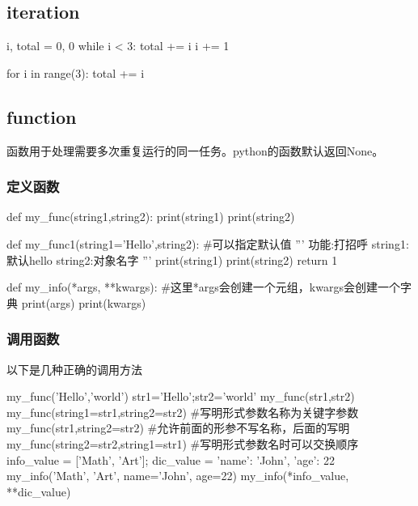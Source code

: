 \documentclass{article}
\begin{document}
    \subsection{iteration}
      \begin{codeblock}[language=python, caption={iteration}]
        i, total = 0, 0
        while i < 3:
          total += i
          i += 1

        for i in range(3):
          total += i
      \end{codeblock}

    \subsection{function}
      函数用于处理需要多次重复运行的同一任务。python的函数默认返回None。
      \subsubsection{定义函数}
        \begin{codeblock}[language=python, caption={definition of functions}]
          def my_func(string1,string2):
            print(string1)
            print(string2)

          def my_func1(string1='Hello',string2): #可以指定默认值
            ''' 功能:打招呼
                string1:默认hello
                string2:对象名字 '''
            print(string1)
            print(string2)
            return 1

          def my_info(*args, **kwargs): #这里*args会创建一个元组，kwargs会创建一个字典
            print(args)
            print(kwargs)
        \end{codeblock}

      \subsubsection{调用函数}
        以下是几种正确的调用方法
        \begin{codeblock}[language=python, caption={use of function}]
          my_func('Hello','world')
          str1='Hello';str2='world'
          my_func(str1,str2)
          my_func(string1=str1,string2=str2) #写明形式参数名称为关键字参数
          my_func(str1,string2=str2) #允许前面的形参不写名称，后面的写明
          my_func(string2=str2,string1=str1) #写明形式参数名时可以交换顺序
          info_value = ['Math', 'Art']; dic_value = {'name': 'John', 'age': 22}
          my_info('Math', 'Art', name='John', age=22)
          my_info(*info_value, **dic_value)
        \end{codeblock}
\end{document}
